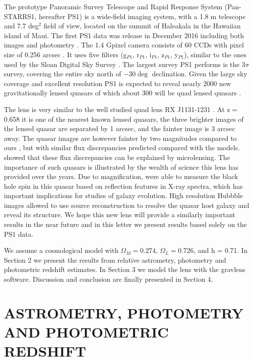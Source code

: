 \documentclass[manuscript]{aastex}
\begin{document}
The prototype Panoramic Survey Telescope and Rapid Response System (Pan-STARRS1, hereafter PS1) is a wide-field imaging system, with a 1.8 m telescope and 7.7 deg$^2$ field of view, located on the summit of Haleakala in the Hawaiian island of Maui. The first PS1 data was release in December 2016 including both images and photometry  \citep[see ][]{cha16}. The 1.4 Gpixel camera consists of 60 CCDs with pixel size of 0.256 arcsec \citep{ona08, ton09}. It uses five filters (g$_{P1}$, r$_{P1}$, i$_{P1}$, z$_{P1}$, y$_{P1}$), similar to the ones used by the Sloan Digital Sky Survey \citep[SDSS ][]{york00}. The largest survey PS1 performs is the 3$\pi$ survey, covering the entire sky north of $-30\deg$ declination. Given the large sky coverage and excellent resolution PS1 is expected to reveal nearly 2000 new gravitationally lensed quasars of which about 300 will be quad lensed quasars \citep{ogu10}.

The lens is very similar to the well studied quad lens RX J1131-1231 \citep{slu03}. At z$=$0.658 it is one of the nearest known lensed quasars, the three brighter images of the lensed quasar are separated by 1 arcsec, and the fainter image is 3 arcsec away. The quasar images are however fainter by two magnitudes compared to ours \citep{slu06}, but with similar flux discrepancies predicted compared with the models. \citet{slu08} showed that these flux discrepancies can be explained by microlensing. The importance of such quasars is illustrated by the wealth of science this lens has provided over the years.  Due to magnification, \citet{reis14} were able to measure the black hole spin in this quasar based on reflection features in X-ray spectra, which has important implications for studies of galaxy evolution. High resolution Hubbble images allowed \citet{bre08} to use source reconstruction to resolve the quasar host galaxy and reveal its structure. We hope this new lens will provide a similarly important results in the near future and in this letter we present results based solely on the PS1 data. 

 
We assume a cosmological model with $\Omega_M = 0.274$, $\Omega_L = 0.726$, and h = 0.71. 
In Section 2 we present the results from relative astrometry, photometry and photometric redshift estimates. In Section 3 we model the lens with the gravlens software. Discussion and conclusion are finally presented in Section 4.



\section{ASTROMETRY, PHOTOMETRY AND PHOTOMETRIC REDSHIFT}
\end{document}

